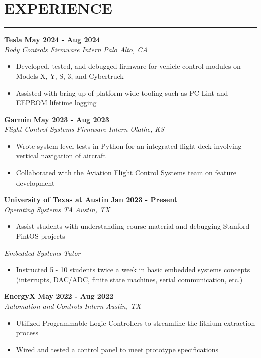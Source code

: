 \documentclass{article}
\newcommand{\sectionHeader}[1]{%
    \vspace{-1.5\baselineskip}
    \section*{\MakeUppercase{\large #1}} %
    \vspace{-1.75\baselineskip} %
    \color{teal}
    \rule{\textwidth}{2pt} %
    \color{black}
    \vspace{-1.5\baselineskip}
}
\newcommand{\role}[3]{
    \textit{#1} \hfill \textit{#2} \\[0pt]
    #3
}
\newcommand{\sectionItem}[5]{ %
    \textbf{#1} \hfill \textbf{#2} \\[0pt]
    \role{#3}{#4}{#5}    %
    \vspace{10pt}
}
\begin{document}
\sectionHeader{experience}
\begin{flushleft}
    \sectionItem{Tesla}{May 2024 - Aug 2024}{Body Controls Firmware Intern}{Palo Alto, CA}{
        \begin{itemize}
            \item[\textbullet] Developed, tested, and debugged firmware for vehicle control modules on Models X, Y, S, 3, and Cybertruck
            \item[\textbullet] Assisted with bring-up of platform wide tooling such as PC-Lint and EEPROM lifetime logging
        \end{itemize}   
    }
    
    \sectionItem{Garmin}{May 2023 - Aug 2023}{Flight Control Systems Firmware Intern}{Olathe, KS}{
        \begin{itemize}
            \item[\textbullet] Wrote system-level tests in Python for an integrated flight deck involving vertical navigation of aircraft
            \item[\textbullet] Collaborated with the Aviation Flight Control Systems team on feature development
        \end{itemize}
    }

    \sectionItem{University of Texas at Austin}{Jan 2023 - Present}{Operating Systems TA}{Austin, TX}{
        \begin{itemize}
            \item[\textbullet] Assist students with understanding course material and debugging Stanford PintOS projects
        \end{itemize}
        \vspace{5pt}
        \role{Embedded Systems Tutor}{}{
            \begin{itemize}
                \item[\textbullet] Instructed 5 - 10 students twice a week in basic embedded systems concepts (interrupts, DAC/ADC, finite state machines, serial communication, etc.)
            \end{itemize}
        }
    }

    \sectionItem{EnergyX}{May 2022 - Aug 2022}{Automation and Controls Intern}{Austin, TX}{
        \begin{itemize}
            \item[\textbullet] Utilized Programmable Logic Controllers to streamline the lithium extraction process
            \item[\textbullet] Wired and tested a control panel to meet prototype specifications
        \end{itemize}
    }
\end{flushleft}
\end{document}

